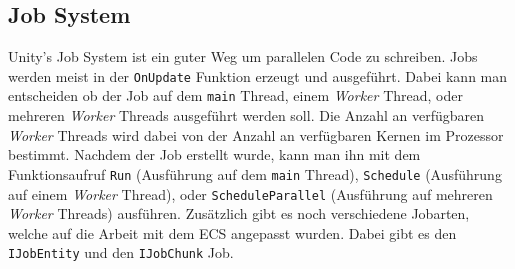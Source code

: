 \subsection{Job System} \label{jobs}
Unity's Job System ist ein guter Weg um parallelen Code zu schreiben. Jobs werden meist in der \texttt{OnUpdate} Funktion erzeugt und ausgeführt. Dabei kann man entscheiden ob der Job auf dem \texttt{main} Thread, einem \textit{Worker} Thread, oder mehreren \textit{Worker} Threads ausgeführt werden soll. Die Anzahl an verfügbaren \textit{Worker} Threads wird dabei von der Anzahl an verfügbaren Kernen im Prozessor bestimmt. Nachdem der Job erstellt wurde, kann man ihn mit dem Funktionsaufruf \texttt{Run} (Ausführung auf dem \texttt{main} Thread), \texttt{Schedule} (Ausführung auf einem \textit{Worker} Thread), oder \texttt{ScheduleParallel} (Ausführung auf mehreren \textit{Worker} Threads) ausführen. Zusätzlich gibt es noch verschiedene Jobarten, welche auf die Arbeit mit dem ECS angepasst wurden. Dabei gibt es den \texttt{IJobEntity} und den \texttt{IJobChunk} Job.
